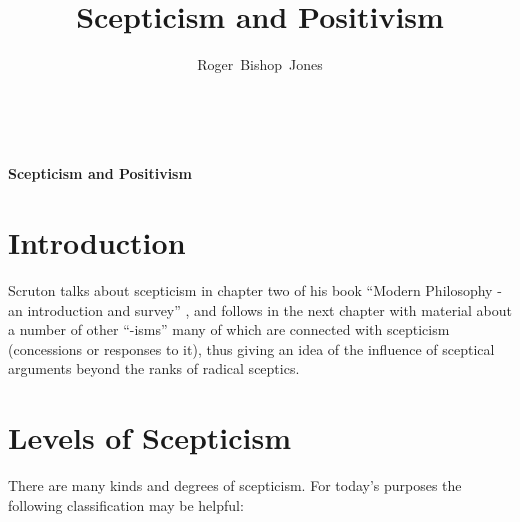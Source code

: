 \documentclass[14pt,titlepage]{extarticle}
\title{Scepticism and Positivism}
\author{Roger~Bishop~Jones}
\date{\ }
\begin{document}

                               
\begin{titlepage}
\maketitle





\end{titlepage}

\begin{centering}
{\LARGE \bf Scepticism and Positivism}
\end{centering}

\setcounter{tocdepth}{1}
{\parskip-0pt\tableofcontents}




\section{Introduction}

Scruton talks about scepticism in chapter two of his book ``Modern Philosophy - an introduction and survey'' \cite{scruton97}, and follows in the next chapter with material about a number of other ``-isms'' many of which are connected with scepticism (concessions or responses to it), thus giving an idea of the influence of sceptical arguments beyond the ranks of radical sceptics.

\section{Levels of Scepticism}

There are many kinds and degrees of scepticism.
For today's purposes the following classification may be helpful:
\end{document}
